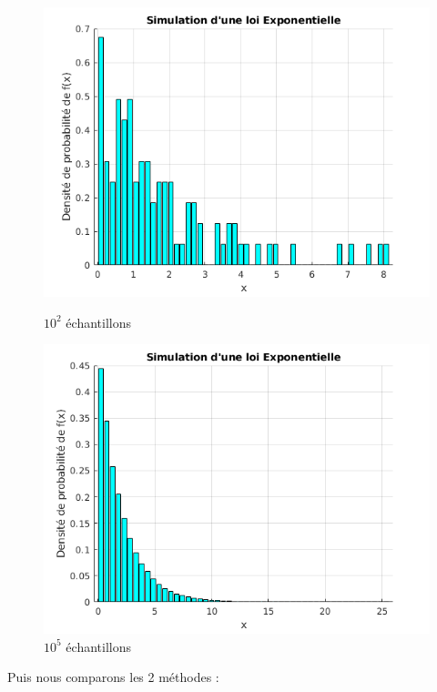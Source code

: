 \documentclass[a4paper,oneside]{article}
\begin{document}
 \begin{figure}[h!]
\centering
    \begin{minipage}[c]{.46\linewidth}
        \centering
        \includegraphics[scale=0.5]{../Exercice3/ddpN=100.png}
        \caption{$10^2$ échantillons}
    \end{minipage}
    \hfill%
    \begin{minipage}[c]{.46\linewidth}
        \centering
        \includegraphics[scale=0.5]{../Exercice3/ddpN=100000.png}
        \caption{$10^5$ échantillons}
    \end{minipage}
\end{figure}
 

 Puis nous comparons les 2 méthodes :
 
\end{document}
